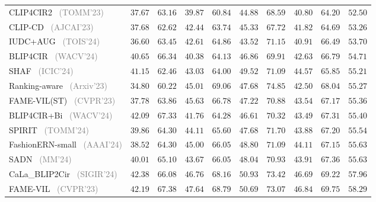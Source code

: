 \begin{table*}
\begin{tabular}{l|cc|cc|cc|cc|c}
    CLIP4CIR2~\cite{baldrati2023CLIP4CIR2} \footnotesize{\textcolor{gray}{(TOMM'23)}} & $37.67$ & $63.16$ & $39.87$ & $60.84$ & $44.88$ & $68.59$ & $40.80$ & $64.20$ & $52.50$ \\
    CLIP-CD~\cite{lin2023clip_cd} \footnotesize{\textcolor{gray}{(AJCAI'23)}} & $37.68$ & $62.62$ & $42.44$ & $63.74$ & $45.33$ & $67.72$ & $41.82$ & $64.69$ & $53.26$ \\
    IUDC+AUG~\cite{ge2024iudc} \footnotesize{\textcolor{gray}{(TOIS'24)}}& $36.60$ & $63.45$ & $42.61$ & $64.86$ & $43.52$ & $71.15$ & $40.91$ & $66.49$ & $53.70$ \\
    BLIP4CIR~\cite{liu2024blip4cir} \footnotesize{\textcolor{gray}{(WACV'24)}} & $40.65$ & $66.34$ & $40.38$ & $64.13$ & $46.86$ & $69.91$ & $42.63$ & $66.79$ & $54.71$ \\
    SHAF~\cite{yan2024shaf} \footnotesize{\textcolor{gray}{(ICIC'24)}} & $41.15$ & $62.46$ & $43.03$ & $64.00$ & $49.52$ & $71.09$ & $44.57$ & $65.85$ & $55.21$ \\
    Ranking-aware~\cite{chen2023ranking} \footnotesize{\textcolor{gray}{(Arxiv'23)}} & $34.80$ & $60.22$ & $45.01$ & $69.06$ & $47.68$ & $74.85$ & $42.50$ & $68.04$ & $55.27$\\
    FAME-VIL(ST)~\cite{han2023fame} \footnotesize{\textcolor{gray}{(CVPR'23)}} & $37.78$ & $63.86$ & $45.63$ & $66.78$ & $47.22$ & $70.88$ & $43.54$ & $67.17$ & $55.36$ \\
    BLIP4CIR+Bi~\cite{liu2024blip4cir} \footnotesize{\textcolor{gray}{(WACV'24)}} & $42.09$ & $67.33$ & $41.76$ & $64.28$ & $46.61$ & $70.32$ & $43.49$ & $67.31$ & $55.40$ \\
    SPIRIT~\cite{chen2024spirit} \footnotesize{\textcolor{gray}{(TOMM'24)}} & $39.86$ & $64.30$ & $44.11$ & $65.60$ & $47.68$ & $71.70$ & $43.88$ & $67.20$ & $55.54$ \\
    FashionERN-small~\cite{chen2024fashionern} \footnotesize{\textcolor{gray}{(AAAI'24)}} & $38.52$ & $64.30$ & $45.00$ & $66.05$ & $48.80$ & $71.09$ & $44.11$ & $67.15$ & $55.63$ \\
    SADN~\cite{wang2024sadn} \footnotesize{\textcolor{gray}{(MM'24)}} & $40.01$ & $65.10$ & $43.67$ & $66.05$ & $48.04$ & $70.93$ & $43.91$ & $67.36$ & $55.63$ \\
    CaLa_BLIP2Cir~\cite{jiang2024cala} \footnotesize{\textcolor{gray}{(SIGIR'24)}} & $42.38$ & $66.08$ & $46.76$ & $68.16$ & $50.93$ & $73.42$ & $46.69$ & $69.22$ & $57.96$ \\
    FAME-VIL~\cite{han2023fame} \footnotesize{\textcolor{gray}{(CVPR'23)}} & $42.19$ & $67.38$ & $47.64$ & $68.79$ & $50.69$ & $73.07$ & $46.84$ & $69.75$ & $58.29$ \\

\end{tabular}
\end{table*}
